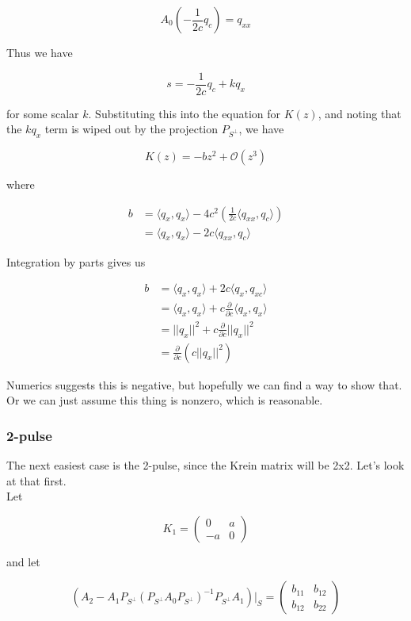 \documentclass[12pt]{article}
\begin{document}
\begin{equation*}\label{uc}
A_0 \left( -\frac{1}{2c} q_c \right) = q_{xx}
\end{equation*}

Thus we have

\[
s = -\frac{1}{2c} q_c + k q_x
\]

for some scalar $k$. Substituting this into the equation for $K(z)$, and noting that the $k q_x$ term is wiped out by the projection $P_{S^\perp}$, we have

\[
K(z) = -b z^2 + \mathcal{O}(z^3)
\]

where

\begin{align*}
b &= \langle q_x, q_x \rangle - 4 c^2 \left(\frac{1}{2c} \langle q_{xx}, q_c \rangle \right)  \\
&= \langle q_x, q_x \rangle - 2 c \langle q_{xx}, q_c \rangle
\end{align*}

Integration by parts gives us

\begin{align*}
b &= \langle q_x, q_x \rangle + 2c \langle q_{x}, q_{xc} \rangle  \\
&= \langle q_x, q_x \rangle + c \frac{\partial}{\partial c}\langle q_x, q_x \rangle \\
&= ||q_x||^2 + c \frac{\partial}{\partial c}||q_x||^2 \\
&= \frac{\partial}{\partial c} \left( c||q_x||^2 \right)
\end{align*}

Numerics suggests this is negative, but hopefully we can find a way to show that. Or we can just assume this thing is nonzero, which is reasonable.

\subsubsection{2-pulse}

The next easiest case is the 2-pulse, since the Krein matrix will be 2x2. Let's look at that first. \\

Let 

\[
K_1 = \begin{pmatrix} 0 & a \\ -a & 0 \end{pmatrix}
\]

and let

\[
\left( A_2 - A_1 P_{S^\perp} (P_{S^\perp} A_0 P_{S^\perp})^{-1} P_{S^\perp} A_1 \right)|_S = \begin{pmatrix} b_{11} & b_{12} \\ b_{12} & b_{22} \end{pmatrix}
\]
\end{document}
